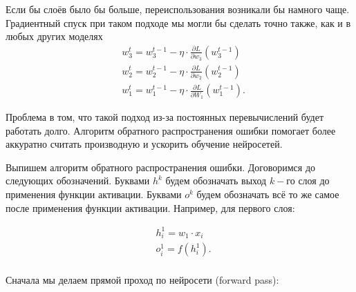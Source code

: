 \begin{sol}
Если бы слоёв было бы больше, переиспользования возникали бы намного чаще. Градиентный спуск при таком подходе мы могли бы сделать точно также, как и в любых других моделях \begin{equation*}
    \begin{aligned} 
    & w_3^t = w_3^{t-1} - \eta \cdot \frac{\partial L}{\partial w_3}(w_3^{t-1}) \\
    & w_2^t = w_2^{t-1} - \eta \cdot\frac{\partial L}{\partial w_2}(w_2^{t-1}) \\
    & w_1^t = w_1^{t-1} - \eta \cdot\frac{\partial L}{\partial W_1}(w_1^{t-1}).
    \end{aligned} 
\end{equation*}

Проблема в том, что такой подход из-за постоянных перевычислений будет работать долго. Алгоритм обратного распространения ошибки помогает более аккуратно считать производную и ускорить обучение нейросетей. 

Выпишем алгоритм обратного распространения ошибки. Договоримся до следующих обозначений. Буквами $h^k$ будем обозначать выход $k-$го слоя до применения функции активации. Буквами  $o^k$ будем обозначать всё то же самое после применения функции активации. Например, для первого слоя:

\begin{equation*}
    \begin{aligned} 
    & h^1_i = w_1 \cdot x_i \\
    & o^1_i = f(h_i^1). \\
    \end{aligned} 
\end{equation*}

Сначала мы делаем прямой проход по нейросети (forward pass): 

\begin{center}
\end{center}


\end{sol}
